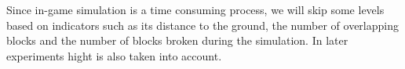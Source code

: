\documentclass[sigconf]{acmart}
\begin{document}
Since in-game simulation is a time consuming process, we will skip some
levels based on indicators such as 
its distance to the ground, the number of overlapping
blocks %
and the number of blocks broken during the simulation. In later experiments
hight is also taken into account.

\end{document}
